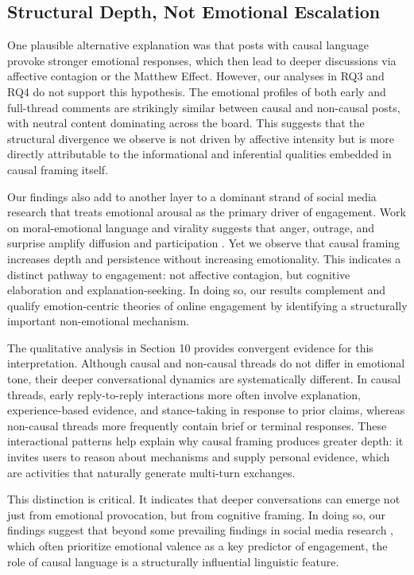 \documentclass[acmsmall]{acmart}
\begin{document}
\subsection{Structural Depth, Not Emotional Escalation}

One plausible alternative explanation was that posts with causal language provoke stronger emotional responses, which then lead to deeper discussions via affective contagion or the Matthew Effect. However, our analyses in RQ3 and RQ4 do not support this hypothesis. The emotional profiles of both early and full-thread comments are strikingly similar between causal and non-causal posts, with neutral content dominating across the board. This suggests that the structural divergence we observe is not driven by affective intensity but is more directly attributable to the informational and inferential qualities embedded in causal framing itself.


Our findings also add to another layer to a dominant strand of social media research that treats emotional arousal as the primary driver of engagement. Work on moral-emotional language and virality suggests that anger, outrage, and surprise amplify diffusion and participation \cite{berger2012makes, stieglitz2013emotions, brady2017emotion}. Yet we observe that causal framing increases depth and persistence without increasing emotionality. This indicates a distinct pathway to engagement: not affective contagion, but cognitive elaboration and explanation-seeking. In doing so, our results complement and qualify emotion-centric theories of online engagement by identifying a structurally important non-emotional mechanism.

The qualitative analysis in Section 10 provides convergent evidence for this interpretation. Although causal and non-causal threads do not differ in emotional tone, their deeper conversational dynamics are systematically different. In causal threads, early reply-to-reply interactions more often involve explanation, experience-based evidence, and stance-taking in response to prior claims, whereas non-causal threads more frequently contain brief or terminal responses. These interactional patterns help explain why causal framing produces greater depth: it invites users to reason about mechanisms and supply personal evidence, which are activities that naturally generate multi-turn exchanges.

This distinction is critical. It indicates that deeper conversations can emerge not just from emotional provocation, but from cognitive framing. In doing so, our findings suggest that beyond some prevailing findings in social media research \cite{brady2017emotion, stieglitz2013emotions}, which often prioritize emotional valence as a key predictor of engagement, the role of causal language is a structurally influential linguistic feature.
\end{document}
